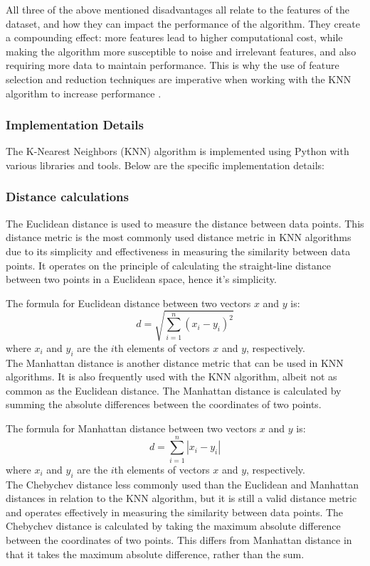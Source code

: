 All three of the above mentioned disadvantages all relate to the features of the dataset, and how they can impact the performance of the algorithm.
They create a compounding effect: more features lead to higher computational cost, while making the algorithm more susceptible to noise and irrelevant features,
and also requiring more data to maintain performance. This is why the use of feature selection and reduction techniques are imperative 
when working with the KNN algorithm to increase performance \cite{distance_func_knn,knn}.


\subsubsection{Implementation Details}
The K-Nearest Neighbors (KNN) algorithm is implemented using Python with various libraries and tools.
Below are the specific implementation details:

\subsubsection*{Distance calculations}
The Euclidean distance is used to measure the distance between data points. 
This distance metric is the most commonly used distance metric in KNN algorithms
due to its simplicity and effectiveness in measuring the similarity between data points\cite{IBM2023}.
It operates on the principle of calculating the straight-line distance between two points in a Euclidean space, hence it's simplicity.

The formula for Euclidean distance between two vectors \(x\) and \(y\) is:
\[ d = \sqrt{\sum_{i=1}^{n} (x_i - y_i)^2} \]
where \(x_i\) and \(y_i\) are the \(i\)th elements of vectors \(x\) and \(y\), respectively.\\

The Manhattan distance is another distance metric that can be used in KNN algorithms. It is also frequently used with the KNN algorithm,
albeit not as common as the Euclidean distance.
The Manhattan distance is calculated by summing the absolute differences between the coordinates of two points.

The formula for Manhattan distance between two vectors \(x\) and \(y\) is:
\[ d = \sum_{i=1}^{n} |x_i - y_i| \]
where \(x_i\) and \(y_i\) are the \(i\)th elements of vectors \(x\) and \(y\), respectively.\\

The Chebychev distance less commonly used than the Euclidean and Manhattan distances
in relation to the KNN algorithm, but it is still a valid distance metric and operates effectively in measuring the similarity between data points.
The Chebychev distance is calculated by taking the maximum absolute difference between the coordinates of two points. This differs from Manhattan distance
in that it takes the maximum absolute difference, rather than the sum.


